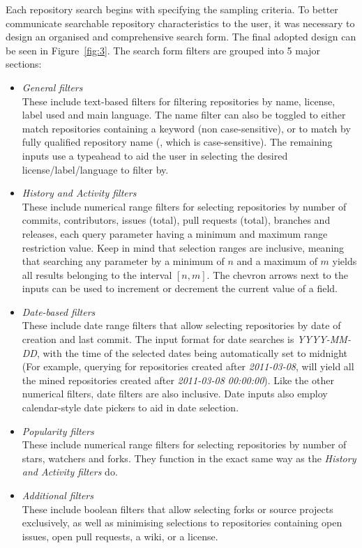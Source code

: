 Each repository search begins with specifying the sampling criteria.
To better communicate searchable repository characteristics to the user, it was necessary to design an organised and comprehensive search form.
The final adopted design can be seen in Figure~\ref{fig:3}.
The search form filters are grouped into 5 major sections:
\begin{itemize}
    \item \textit{General filters}
    \\These include text-based filters for filtering repositories by name, license, label used and main language. The name filter can also be toggled to either match repositories containing a keyword (non case-sensitive), or to match by fully qualified repository name (, which is case-sensitive). The remaining inputs use a typeahead to aid the user in selecting the desired license/label/language to filter by.
    \item \textit{History and Activity filters}
    \\These include numerical range filters for selecting repositories by number of commits, contributors, issues (total), pull requests (total), branches and releases, each query parameter having a minimum and maximum range restriction value. Keep in mind that selection ranges are inclusive, meaning that searching any parameter by a minimum of $n$ and a maximum of $m$ yields all results belonging to the interval $[n,m]$. The chevron arrows next to the inputs can be used to increment or decrement the current value of a field.
    \item \textit{Date-based filters}
    \\These include date range filters that allow selecting repositories by date of creation and last commit. The input format for date searches is \textit{YYYY-MM-DD}, with the time of the selected dates being automatically set to midnight (For example, querying for repositories created after \textit{2011-03-08}, will yield all the mined repositories created after \textit{2011-03-08 00:00:00}). Like the other numerical filters, date filters are also inclusive. Date inputs also employ calendar-style date pickers to aid in date selection.
    \item \textit{Popularity filters}
    \\These include numerical range filters for selecting repositories by number of stars, watchers and forks. They function in the exact same way as the \textit{History and Activity filters} do.
    \item \textit{Additional filters}
    \\These include boolean filters that allow selecting forks or source projects exclusively, as well as minimising selections to repositories containing open issues, open pull requests, a wiki, or a license.
\end{itemize}

